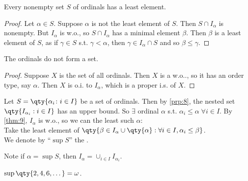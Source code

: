\begin{proposition} \label{prp:10}
    Every nonempty set $S$ of ordinals has a least element.
\end{proposition}

\begin{proof}
    Let $\alpha \in S$.
    Suppose $\alpha$ is not the least element of $S$.
    Then $S \cap I_\alpha$ is nonempty.
    But $I_\alpha$ is w.o., so $S \cap I_\alpha$ has a minimal element $\beta$.
    Then $\beta$ is a least element of $S$, as if $\gamma \in S$ s.t. $\gamma < \alpha$, then $\gamma \in I_\alpha \cap S$ and so $\beta \leq \gamma$.
\end{proof}

\begin{theorem}
    The ordinals do not form a set.
\end{theorem}

\begin{proof}
    Suppose $X$ is the set of all ordinals.
    Then $X$ is a w.o.., so it has an order type, say $\alpha$.
    Then $X$ is o.i. to $I_\alpha$, which is a proper i.s. of $X$. \Lightning
\end{proof}

\begin{remark}
    Let $S = \qty{\alpha_i \colon i \in I}$ be a set of ordinals.
    Then by \cref{prp:8}, the nested set $\qty{I_{\alpha_i} : i \in I}$ has an upper bound.
    So $\exists$ ordinal $\alpha$ s.t. $\alpha_i \leq \alpha \; \forall i \in I$.
    By \cref{thm:9}, $I_\alpha$ is w.o., so we can the least such $\alpha$: \\
    Take the least element of $\qty{\beta \in I_\alpha \cup \qty{\alpha} : \forall i \in I, \alpha_i \leq \beta}$. \\
    We denote by ``$\sup S$'' the .

    Note if $\alpha = \sup S$, then $I_\alpha = \cup_{i \in I} I_{\alpha_i}$.
\end{remark}

\begin{example}
    $\sup \qty{2, 4, 6, \dots} = \omega$.
\end{example}

